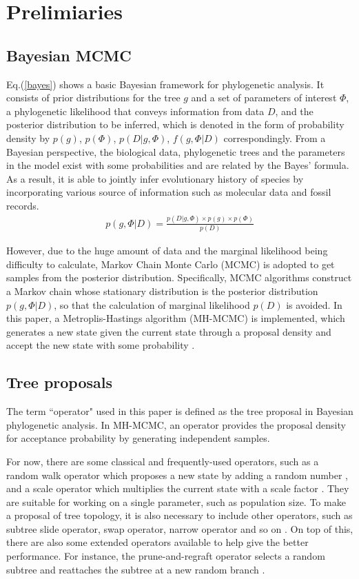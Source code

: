 \documentclass{bmcart}
\begin{document}
\section*{Prelimiaries}
\subsection*{Bayesian MCMC}
Eq.(\ref{bayes}) shows a basic Bayesian framework for phylogenetic analysis. It consists of prior distributions for the tree $g$ and a set of parameters of interest $\Phi $, a phylogenetic likelihood that conveys information from data $D$, and the posterior distribution to be inferred, which is denoted in the form of probability density by $p(g) $, $p(\Phi )$, $p(D|g,\Phi )$, $f(g,\Phi |D)$ correspondingly. From a Bayesian perspective, the biological data, phylogenetic trees and the parameters in the model exist with some probabilities and are related by the Bayes' formula. As a result, it is able to jointly infer evolutionary history of species  by incorporating various source of information such as molecular data and fossil records.
\begin{eqnarray}\label{bayes}
p(g,\Phi |D) = \frac{{p (D|g,\Phi ) \times p (g) \times p (\Phi )}}{{p (D)}}
\end{eqnarray}

However, due to the huge amount of data and the marginal likelihood being difficulty to calculate, Markov Chain Monte Carlo (MCMC) is adopted to get samples from the posterior distribution. Specifically, MCMC algorithms construct a Markov chain whose stationary distribution is the posterior distribution $p(g,\Phi |D)$, so that the calculation of marginal likelihood $p (D)$ is avoided. In this paper, a Metroplis-Hastings algorithm (MH-MCMC) is implemented, which generates a new state given the current state through a proposal density and accept the new state with some probability \cite{metropolis1953equation,hastings1970monte}.
\subsection*{Tree proposals}
\label{treeproposals}
The term ``operator" used in this paper is defined as the tree proposal in Bayesian phylogenetic analysis. In MH-MCMC, an operator provides the proposal density for acceptance probability by generating independent samples. 

For now, there are some classical and frequently-used operators, such as a random walk operator which proposes a new state by adding a random number \cite{suchard2005stochastic}, and a scale operator which multiplies the current state with a scale factor \cite{higuchi1997monte}. They are suitable for working on a single parameter, such as population size. To make a proposal of tree topology, it is also necessary to include other operators, such as subtree slide operator, swap operator, narrow operator and so on \cite{hohna2008clock}. On top of this, there are also some extended operators available to help give the better performance. For instance, the prune-and-regraft operator selects a random subtree and reattaches the subtree at a new random branch \cite{hohna2011guided}. 
\end{document}
